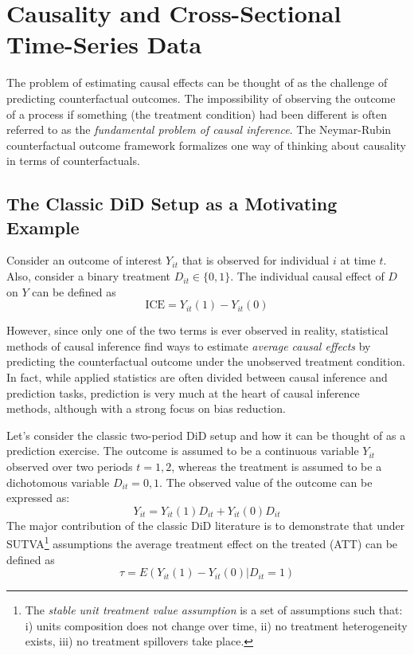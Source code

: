 \documentclass[hidelinks]{article}\usepackage[]{graphicx}\usepackage[]{color}
\begin{document}
\section{Causality and Cross-Sectional Time-Series Data}

The problem of estimating causal effects can be thought of as the challenge of predicting counterfactual outcomes. The impossibility of observing the outcome of a process if something (the treatment condition) had been different is often referred to as the \textit{fundamental problem of causal inference}. The Neymar-Rubin counterfactual outcome framework formalizes one way of thinking about causality in terms of counterfactuals. 

\subsection{The Classic DiD Setup as a Motivating Example}

Consider an outcome of interest $Y_{it}$ that is observed for individual $i$ at time $t$. Also, consider a binary treatment $D_{it} \in \{ 0, 1 \}$. The individual causal effect of $D$ on $Y$ can be defined as 
$$\text{ICE} = Y_{it}(1) - Y_{it}(0)$$

However, since only one of the two terms is ever observed in reality, statistical methods of causal inference find ways to estimate \textit{average causal effects} by predicting the counterfactual outcome under the unobserved treatment condition. In fact, while applied statistics are often divided between causal inference and prediction tasks, prediction is very much at the heart of causal inference methods, although with a strong focus on bias reduction.

Let's consider the classic two-period DiD setup and how it can be thought of as a prediction exercise. The outcome is assumed to be a continuous variable $Y_{it}$ observed over two periods $t=1, 2$, whereas the treatment is assumed to be a dichotomous variable $D_{it} = 0, 1$. The observed value of the outcome can be expressed as:
$$ Y_{it} = Y_{it}(1)D_{it} + Y_{it}(0)D_{it} $$
The major contribution of the classic DiD literature \parencite[e.g.,][]{Angrist2009} is to demonstrate that under SUTVA\footnote{The \textit{stable unit treatment value assumption} is a set of assumptions such that: i) units composition does not change over time, ii) no treatment heterogeneity exists, iii) no treatment spillovers take place.} assumptions the average treatment effect on the treated (ATT) can be defined as
$$ \tau = E(Y_{it} (1) - Y_{it}(0) | D_{it} = 1) $$
\end{document}
